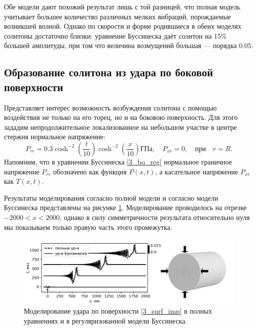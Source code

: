 \documentclass[12pt, a4paper]{report}
\newcommand{\lb}{\left (}
\newcommand{\rb}{\right )}
\begin{document}
Обе модели дают похожий результат лишь с той разницей, что полная модель учитывает большее количество различных мелких вибраций, порождаемые возникшей волной. Однако по скорости и форме родившиеся в обеих моделях солитоны достаточно близки: уравнение Буссинеска даёт солитон на 15\% большей амплитуды, при том что величина возмущений большая --- порядка $0.05$.


\subsection{Образование солитона из удара по боковой поверхности}
Представляет интерес возможность возбуждения солитона с помощью воздействия не только на его торец, но и на боковою поверхность. Для этого зададим непродолжительное локализованное на небольшом участке в центре стержня нормальное напряжение:
\begin{equation}\label{3_surf_imp}
P_{rr} = 0.3 \cosh^{-2}\lb\frac{t}{10}\rb \cosh^{-2}\lb\frac{x}{10}\rb\mbox{ГПа}, \quad P_{xr} = 0, \quad \mbox{при} \quad r=R.
\end{equation}
Напомним, что в уравнении Буссинеска \eqref{3_bq_reg} нормальное граничное напряжение $P_{rr}$ обозначено как функция $P(x,t)$, а касательное напряжение $P_{xr}$ как $T(x,t)$.

Результаты моделирования согласно полной модели и согласно модели Буссинеска представлены на рисунке \ref{fig:surf_impact}. Моделирование проводилось на отрезке $-2000<x<2000$, однако в силу симметричности результата относительно нуля мы показываем только правую часть этого промежутка. 
\begin{figure}[h]
	\centering
	\includegraphics[width=\linewidth]{Figures/SurfImpact}
	\caption{Моделирование удара по поверхности \eqref{3_surf_imp} в полных уравнениях и в регуляризованной модели Буссинеска.}
	\label{fig:surf_impact}
\end{figure}
\end{document}
